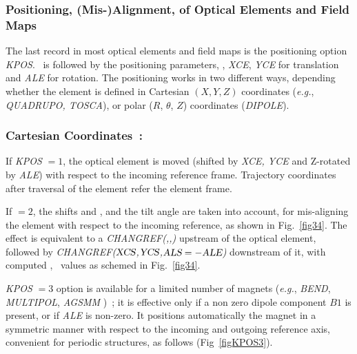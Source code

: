\subsubsection{Positioning, 
(Mis-)Alignment, 
of Optical Elements  and Field Maps} \label{sec4.6.2} 

The last record in most optical elements and field maps is the positioning option 
\textsl{KPOS}. \KPOS\ is followed by the positioning parameters, 
\eg, \textsl{XCE}, \textsl{YCE} 
for translation and \textsl{ALE} for rotation. The positioning works in two different ways, 
depending  whether the element is  defined in 
Cartesian $ (X, Y, Z) $ coordinates (\emph{e.g.}, \textsl{QUADRUPO, TOSCA}),
 or polar 
 ($R$, $\theta$, $Z$)  coordinates (\textsl{DIPOLE}). 
 
 \subsubsection*{Cartesian Coordinates~: } 
 
 If \textsl{KPOS} $ =1$, the optical element is moved (shifted by \textsl{XCE, YCE} and Z-rotated by 
\textsl{ALE}) with respect to the incoming reference frame. Trajectory coordinates after traversal of the 
element refer the element frame. 

\medskip

\noindent If  \KPOS$=2 $, the shifts  \XCE{}   
and   \YCE{}, and the tilt angle \ALE{}   are taken into 
account, for mis-aligning  the element with respect to the incoming 
reference, as shown in Fig.~\ref{fig34}.  
The effect is equivalent to  a \textsl{CHANGREF(\XCE,\YCE,\ALE)}  upstream of the 
optical element, followed by   \textsl{CHANGREF($\textsl{XCS}$,$\textsl{YCS}$,$\textsl{ALS}=-\textsl{ALE}$)} downstream of it, with 
 computed \XCS, \YCS\ values as schemed in Fig.~\ref{fig34}.  

\medskip

\noindent \textsl{KPOS} $=3 $ option is available for a limited number of  
 magnets  (\emph{e.g.}, \textsl{BEND}, \textsl{MULTIPOL}, \textsl{AGSMM} )~; 
it is effective only if a non zero dipole component $B1$ is present, or if  \textsl{ALE} is non-zero. 
It positions automatically the magnet in a symmetric manner with respect to the incoming and outgoing reference 
axis, convenient for periodic structures, as follows (Fig~\ref{figKPOS3}). 

